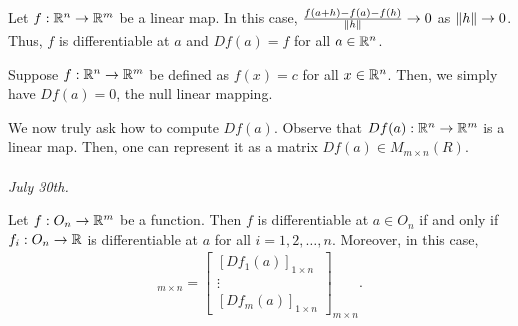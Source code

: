 \begin{example}
    Let $f:\mathbb{R}^{n} \to \mathbb{R}^{m}$ be a linear map. In this case, $\frac{f(a+h)-f(a)-f(h)}{\left\lVert h\right\rVert} \to 0$ as $\left\lVert h\right\rVert \to 0$. Thus, $f$ is differentiable at $a$ and $Df(a) = f$ for all $a \in \mathbb{R}^{n}$.
\end{example}

\begin{example}
    Suppose $f:\mathbb{R}^{n} \to \mathbb{R}^{m}$ be defined as $f(x) = c$ for all $x \in \mathbb{R}^{n}$. Then, we simply have $Df(a) = 0$, the null linear mapping.
\end{example}

We now truly ask how to compute $Df(a)$. Observe that $Df(a):\mathbb{R}^{n}\to\mathbb{R}^{m}$ is a linear map. Then, one can represent it as a matrix $Df(a) \in M_{m \times n}(R)$.\\ \\
\textit{July 30th.}

\begin{theorem}
    Let $f:O_{n} \to \mathbb{R}^{m}$ be a function. Then $f$ is differentiable at $a \in O_{n}$ if and only if $f_{i}:O_{n} \to \mathbb{R}$ is differentiable at $a$ for all $i = 1,2,\ldots,n$. Moreover, in this case, 
    \begin{align}
        [Df(a)]_{m \times n} = \begin{bmatrix}
            [Df_{1}(a)]_{1 \times n} \\ \vdots \\ [Df_{m}(a)]_{1 \times n}
        \end{bmatrix}_{m \times n}.
    \end{align}
\end{theorem}

